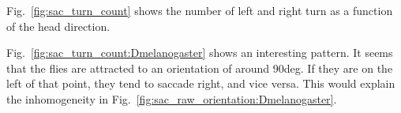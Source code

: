 
Fig.~\ref{fig:sac_turn_count} shows the number of left and right turn as a function of the head direction. 

Fig.~\ref{fig:sac_turn_count:Dmelanogaster} shows an interesting pattern. It seems that the flies are attracted to an orientation of around 90deg. If they are on the left of that point, they tend to saccade right, and vice versa. This would explain the inhomogeneity in Fig.~\ref{fig:sac_raw_orientation:Dmelanogaster}.
